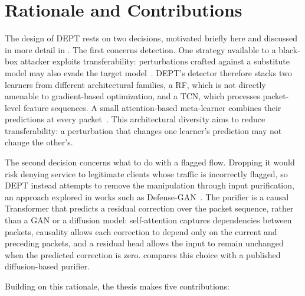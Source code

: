 \section{Rationale and Contributions}\label{sec:intro-contributions}
The design of DEPT rests on two decisions, motivated briefly here and discussed in more detail in
.
The first
concerns detection. One strategy available to a black-box attacker exploits transferability:
perturbations crafted against a substitute model may also evade the target model~\cite{papernot2017practical}.
DEPT's detector therefore stacks two learners from different architectural families, a
\ac{RF}, which is not directly amenable to gradient-based optimization, and a \ac{TCN}, which processes packet-level feature sequences.
A small attention-based meta-learner combines their predictions at every packet~\cite{wolpert1992stacked}. 
This architectural diversity aims to reduce transferability: a perturbation that changes one learner's prediction may not change the other's. 

The second decision concerns what to do with a flagged flow. Dropping it would risk denying service to legitimate clients whose traffic is incorrectly flagged, so DEPT instead attempts to remove the manipulation through input purification, an approach explored in works such as
Defense-GAN~\cite{samangouei2018defense}. The purifier is a causal Transformer that
predicts a residual correction over the packet sequence, rather than a \ac{GAN} or a
diffusion model: self-attention captures dependencies between packets, causality allows each correction to depend only on the current and preceding packets, and a residual head allows the input to remain unchanged when the predicted correction is zero.  compares this choice with a published diffusion-based purifier.

Building on this rationale, the thesis makes five contributions:

